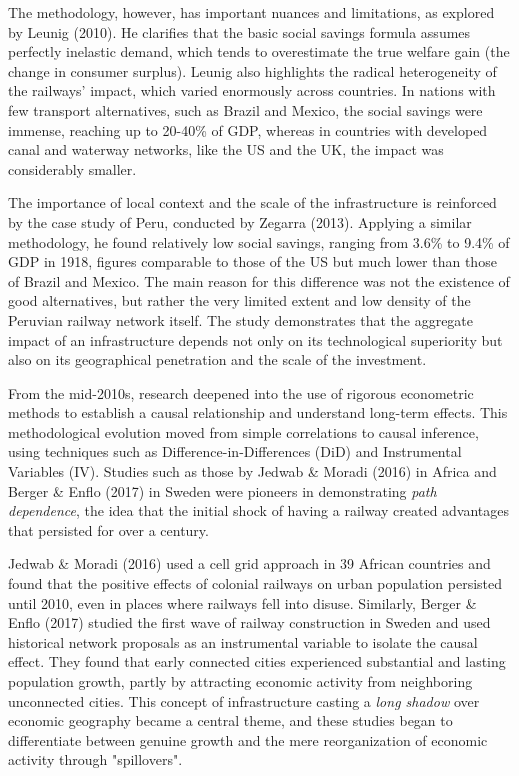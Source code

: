 \documentclass[12pt, a4paper]{article}
\begin{document}
The methodology, however, has important nuances and limitations, as explored by Leunig (2010). He clarifies that the basic social savings formula assumes perfectly inelastic demand, which tends to overestimate the true welfare gain (the change in consumer surplus). Leunig also highlights the radical heterogeneity of the railways' impact, which varied enormously across countries. In nations with few transport alternatives, such as Brazil and Mexico, the social savings were immense, reaching up to 20-40\% of GDP, whereas in countries with developed canal and waterway networks, like the US and the UK, the impact was considerably smaller.

The importance of local context and the scale of the infrastructure is reinforced by the case study of Peru, conducted by Zegarra (2013). Applying a similar methodology, he found relatively low social savings, ranging from 3.6\% to 9.4\% of GDP in 1918, figures comparable to those of the US but much lower than those of Brazil and Mexico. The main reason for this difference was not the existence of good alternatives, but rather the very limited extent and low density of the Peruvian railway network itself. The study demonstrates that the aggregate impact of an infrastructure depends not only on its technological superiority but also on its geographical penetration and the scale of the investment.


From the mid-2010s, research deepened into the use of rigorous econometric methods to establish a causal relationship and understand long-term effects. This methodological evolution moved from simple correlations to causal inference, using techniques such as Difference-in-Differences (DiD) and Instrumental Variables (IV). Studies such as those by Jedwab \& Moradi (2016) in Africa and Berger \& Enflo (2017) in Sweden were pioneers in demonstrating \textit{path dependence}, the idea that the initial shock of having a railway created advantages that persisted for over a century.

Jedwab \& Moradi (2016) used a cell grid approach in 39 African countries and found that the positive effects of colonial railways on urban population persisted until 2010, even in places where railways fell into disuse. Similarly, Berger \& Enflo (2017) studied the first wave of railway construction in Sweden and used historical network proposals as an instrumental variable to isolate the causal effect. They found that early connected cities experienced substantial and lasting population growth, partly by attracting economic activity from neighboring unconnected cities. This concept of infrastructure casting a \textit{long shadow} over economic geography became a central theme, and these studies began to differentiate between genuine growth and the mere reorganization of economic activity through "spillovers".
\end{document}
